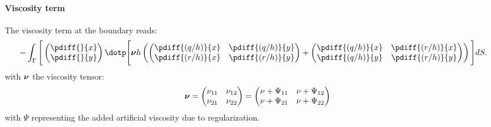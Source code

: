 \paragraph*{Viscosity term}
The viscosity term at the boundary reads:
\begin{align}
    -\int_\Gamma \Bigg[
    &
    \begin{pmatrix}
        \pdiff{}{x} \\
        \pdiff{}{y}
    \end{pmatrix}
    \dotp
    \Bigg[
    \mat{\nu} h
    \left(
    \begin{pmatrix}
        \pdiff{(q/h)}{x} & \pdiff{(q/h)}{y}
        \\
        \pdiff{(r/h)}{x} & \pdiff{(r/h)}{y}
    \end{pmatrix}
    +
    \begin{pmatrix}
        \pdiff{(q/h)}{x} & \pdiff{(r/h)}{x}
        \\
        \pdiff{(q/h)}{y} & \pdiff{(r/h)}{y}
    \end{pmatrix}
    \right)
\Bigg] dS.
\end{align}
with $\mbox{\boldmath ${\mathrm{\nu}}$}$ the viscosity tensor:
\begin{align}
    \mbox{\boldmath ${\mathrm{\nu}}$} =
    \begin{pmatrix}
        \nu_{11} & \nu_{12} \\
        \nu_{21}  & \nu_{22}
    \end{pmatrix}=
    \begin{pmatrix}
        \nu + \Psi_{11} & \nu + \Psi_{12} \\
        \nu + \Psi_{21}  & \nu + \Psi_{22}
    \end{pmatrix}
\end{align}
with $\Psi$ representing the added artificial viscosity due to regularization.

